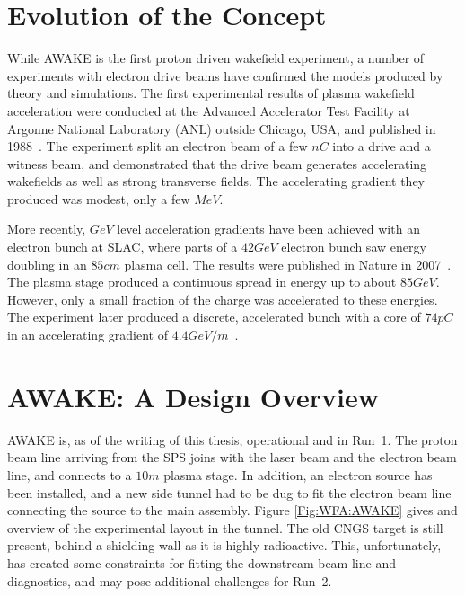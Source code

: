 \section{Evolution of the Concept}
\label{WFA:History}

While AWAKE is the first proton driven wakefield experiment, a number of experiments with electron drive beams have confirmed the models produced by theory and simulations. The first experimental results of plasma wakefield acceleration were conducted at the Advanced Accelerator Test Facility at Argonne National Laboratory (ANL) outside Chicago, USA, and published in 1988~\cite{rosenzweig:1988}. The experiment split an electron beam of a few $\unit{nC}$ into a drive and a witness beam, and demonstrated that the drive beam generates accelerating wakefields as well as strong transverse fields. The accelerating gradient they produced was modest, only a few $\unit{MeV}$.

More recently, $\unit{GeV}$ level acceleration gradients have been achieved with an electron bunch at SLAC, where parts of a $42\unit{GeV}$ electron bunch saw energy doubling in an $85\unit{cm}$ plasma cell. The results were published in Nature in 2007~\cite{blumenfeld:2007}. The plasma stage produced a continuous spread in energy up to about $85\unit{GeV}$. However, only a small fraction of the charge was accelerated to these energies. The experiment later produced a discrete, accelerated bunch with a core of $74\unit{pC}$ in an accelerating gradient of $4.4\unit{GeV/m}$~\cite{litos:2014}.



\section{AWAKE: A Design Overview}
\label{WFA:Design}

AWAKE is, as of the writing of this thesis, operational and in Run~1. The proton beam line arriving from the SPS joins with the laser beam and the electron beam line, and connects to a $10\unit{m}$ plasma stage. In addition, an electron source has been installed, and a new side tunnel had to be dug to fit the electron beam line connecting the source to the main assembly. Figure \ref{Fig:WFA:AWAKE} gives and overview of the experimental layout in the tunnel. The old CNGS target is still present, behind a shielding wall as it is highly radioactive. This, unfortunately, has created some constraints for fitting the downstream beam line and diagnostics, and may pose additional challenges for Run~2.


